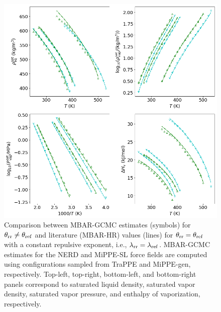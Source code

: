 \documentclass[journal=jced,manuscript=article]{achemso}
\begin{document}
	\begin{figure}[htb!]
		\centering
		\includegraphics[width=6.4in]{refFF_to_rrFF_lam_constant.png}
		\caption{Comparison between MBAR-GCMC estimates (symbols) for $\theta_{\rm rr} \neq \theta_{\rm ref}$ and literature (MBAR-HR) values (lines) for $\theta_{\rm rr} = \theta_{\rm ref}$ with a constant repulsive exponent, i.e., $\lambda_{\rm rr} = \lambda_{\rm ref}$. MBAR-GCMC estimates for the NERD and MiPPE-SL force fields are computed using configurations sampled from TraPPE and MiPPE-gen, respectively. Top-left, top-right, bottom-left, and bottom-right panels correspond to saturated liquid density, saturated vapor density, saturated vapor pressure, and enthalpy of vaporization, respectively.}
		\label{fig:refFF_to_rrFF_lam_constant}
	\end{figure}
\end{document}
